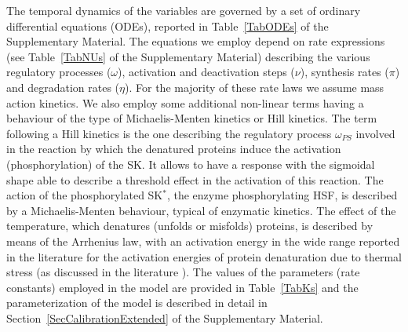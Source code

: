 \documentclass[oneside, 10pt, a4paper, twocolumn]{article}
\begin{document}
The temporal dynamics of the variables are governed by a set of ordinary differential equations (ODEs),
reported in Table~\ref{TabODEs} of the Supplementary Material. 
The equations we employ depend on rate expressions (see Table~\ref{TabNUs} of the Supplementary Material) describing the various regulatory processes ($\omega$), activation and deactivation steps ($\nu$), synthesis rates ($\pi$) and
degradation rates ($\eta$). 
For the majority of these rate laws we assume mass action kinetics. We also employ some additional non-linear terms having a behaviour of the type of Michaelis-Menten kinetics or Hill kinetics.  %
The term following a Hill kinetics is the one describing the regulatory process $\omega_{PS}$ involved in the reaction by which the denatured proteins induce the activation (phosphorylation) of the SK. It allows to have a response with the sigmoidal shape able to describe a threshold effect in the activation of this reaction. 
The action of the phosphorylated SK$^*$, the enzyme phosphorylating HSF, is described by a Michaelis-Menten behaviour, typical of enzymatic kinetics. 
The effect of the temperature, which denatures (unfolds or misfolds) proteins, is described by means of the Arrhenius law, with an activation energy 
in the wide range reported in the literature for the activation energies of protein denaturation due to thermal stress (as discussed in the literature \cite{Bischof2006,He2003}). 
The values of the parameters (rate constants) employed in the model are provided in Table~\ref{TabKs} and the parameterization of the model is described in detail in Section~\ref{SecCalibrationExtended} of the Supplementary Material.
\end{document}
